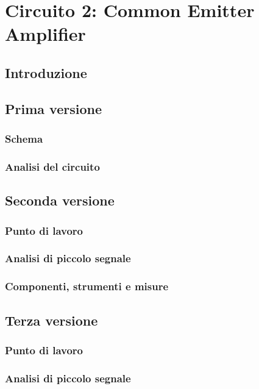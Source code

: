 \documentclass{report}
\begin{document}
\clearpage
\newpage
\chapter{Circuito 2: Common Emitter Amplifier}
\section{Introduzione} 
\section{Prima versione} %
\subsection{Schema} %
\subsection{Analisi del circuito} 
\section{Seconda versione} %
\subsection{Punto di lavoro} 
\subsection{Analisi di piccolo segnale} 
\subsection{Componenti, strumenti e misure} 
\section{Terza versione} %
\subsection{Punto di lavoro} 
\subsection{Analisi di piccolo segnale}  
\end{document}
